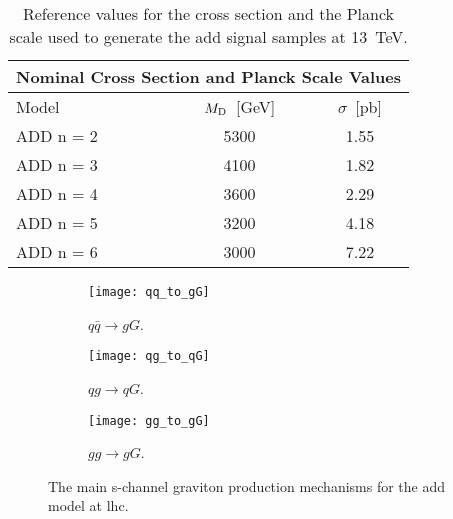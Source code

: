 \begin{table}[!h]
  \centering
  \begin{tabular}{lcc}
    \toprule
    \multicolumn{3}{c}{Nominal Cross Section and Planck Scale Values} \\
    \midrule \midrule
    Model & $M_\mathrm{D}$~[GeV] & $\sigma$~[pb] \\
    \midrule
    ADD n = 2 & 5300 & 1.55 \\
    ADD n = 3 & 4100 & 1.82 \\
    ADD n = 4 & 3600 & 2.29 \\
    ADD n = 5 & 3200 & 4.18 \\
    ADD n = 6 & 3000 & 7.22 \\
    \bottomrule
  \end{tabular}
  \caption{Reference values for the cross section and the Planck scale used to
    generate the \gls{add} signal samples at 13~TeV.}
  \label{tab:sigma_md_ref}
\end{table}
\begin{figure}[!h]
  \centering
  \begin{subfigure}{.48\linewidth}
    \texttt{[image: qq\_to\_gG]}
    \caption{$q \bar{q} \rightarrow g G$.}
  \end{subfigure}
  \begin{subfigure}{.48\linewidth}
    \texttt{[image: qg\_to\_qG]}
    \caption{$q g \rightarrow q G$.}
  \end{subfigure}
  \begin{subfigure}{.48\linewidth}
    \texttt{[image: gg\_to\_gG]}
    \caption{$g g \rightarrow g G$.}
  \end{subfigure}
  \caption{The main s-channel graviton production mechanisms for the \gls{add}
    model at \gls{lhc}.}
  \label{fig:add_feynman}
\end{figure}
